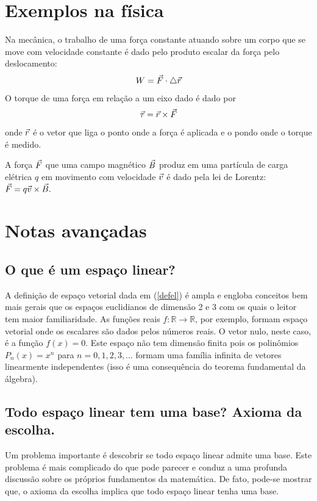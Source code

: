 \section{Exemplos na física}
Na mecânica, o trabalho de uma força constante atuando sobre um corpo que se move com velocidade constante é dado pelo produto escalar da força pelo deslocamento:
$$W=\vec{F}\cdot \triangle\vec{ r}$$
O torque de uma força em relação a um eixo dado é dado por
$$\vec{\tau}=\vec{r}\times \vec{F}$$
onde $\vec{r}$ é o vetor que liga o ponto onde a força é aplicada e o pondo onde o torque é medido. 

A força $\vec{F}$ que uma campo magnético $\vec{B}$ produz em uma partícula de carga elétrica $q$ em movimento com velocidade $\vec{v}$ é dado pela lei de Lorentz:
$\vec{F}=q\vec{v}\times\vec{B}.$

\section{Notas avançadas}
\subsection{O que é um espaço linear?}
A definição de espaço vetorial dada em (\ref{defel}) é ampla e engloba conceitos bem mais gerais que os espaços euclidianos de dimensão 2 e 3 com os quais o leitor tem maior familiaridade. As funções reais $f:\mathbb{R}\to\mathbb{R}$, por exemplo, formam espaço vetorial onde os escalares são dados pelos números reais. O vetor nulo, neste caso, é a função $f(x)=0$. Este espaço não tem dimensão finita pois os polinômios $P_{n}(x)=x^n$ para $n=0,1,2,3,\ldots$ formam uma família infinita de vetores linearmente independentes (isso é uma consequência do teorema fundamental da álgebra).      

\subsection{Todo espaço linear tem uma base? Axioma da escolha.}
Um problema importante é descobrir se todo espaço linear admite uma base. Este problema é mais complicado do que pode parecer e conduz a uma profunda discussão sobre os próprios fundamentos da matemática. De fato, pode-se mostrar que, o axioma da escolha implica que todo espaço linear tenha uma base. 

